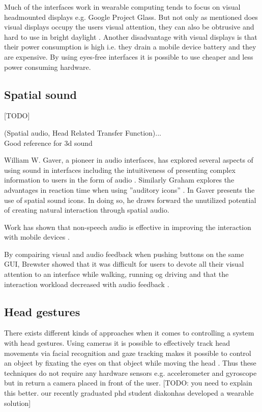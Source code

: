 Much of the interfaces work in wearable computing tends to focus on visual headmounted displays \cite{barfield_fundamentals_2000} e.g. Google Project Glass. But not only as mentioned does visual displays occupy the users visual attention, they can also be obtrusive and hard to use in bright daylight \cite{geelhoed_safety_2000}. Another disadvantage with visual displays is that their power consumption is high i.e. they drain a mobile device battery and they are expensive. By using eyes-free interfaces it is possible to use cheaper and less power consuming hardware.


\subsection{Spatial sound}
[TODO]

(Spatial audio, Head Related Transfer Function)...\\
Good reference for 3d sound \cite{begault_3dd_1994}

William W. Gaver, a pioneer in audio interfaces, has explored several aspects of using sound in interfaces including the intuitiveness of presenting complex information to users in the form of audio \cite{gaver_sonicfinder:_1989}. Similarly Graham explores the advantages in reaction time when using ”auditory icons” \cite{graham_use_1999}. In \cite{gaver_auditory_1986} Gaver presents the use of spatial sound icons. In doing so, he draws forward the unutilized potential of creating natural interaction through spatial audio.

Work has shown that non-speech audio is effective in improving the interaction with mobile devices \cite{pirhonen_gestural_2002, sawhney_nomadic_2000}.

By compairing visual and audio feedback when pushing buttons on the same GUI, Brewster showed that it was difficult for users to devote all their visual attention to an interface while walking, running og driving and that the interaction workload decreased with audio feedback \cite{brewster_overcoming_2002}.


\subsection{Head gestures}
There exists different kinds of approaches when it comes to controlling a system with head gestures. Using cameras it is possible to effectively track head movements via facial recognition \cite{morimoto_recognition_1996} and gaze tracking makes it possible to control an object by fixating the eyes on that object while moving the head \cite{mardanbegi_eye-based_2012}. Thus these techniques do not require any hardware sensors e.g. accelerometer and gyroscope but in return a camera placed in front of the user. [TODO: you need to explain this better. our recently graduated phd student diakonhas developed a wearable solution]


